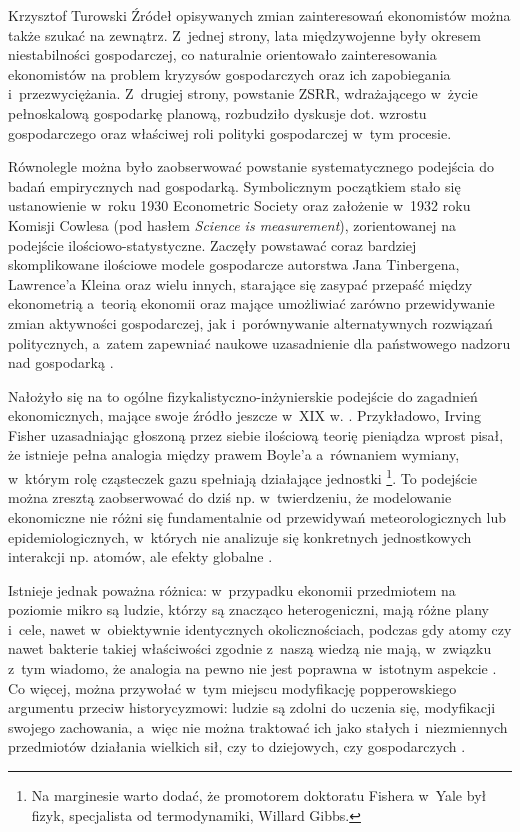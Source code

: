 \begin{artplenv}{Krzysztof Turowski}
Źródeł opisywanych zmian zainteresowań ekonomistów można także szukać na zewnątrz. Z~jednej strony, lata międzywojenne
były okresem niestabilności gospodarczej, co naturalnie orientowało zainteresowania ekonomistów na problem kryzysów
gospodarczych oraz ich zapobiegania i~przezwyciężania. Z~drugiej strony, powstanie ZSRR, wdrażającego w~życie
pełnoskalową gospodarkę planową, rozbudziło dyskusje dot. wzrostu gospodarczego oraz właściwej roli polityki
gospodarczej w~tym procesie.

Równolegle można było zaobserwować powstanie systematycznego podejścia do badań empirycznych nad gospodarką.
Symbolicznym początkiem stało się ustanowienie w~roku 1930 Econometric Society oraz założenie w~1932 roku Komisji
Cowlesa (pod hasłem \textit{Science is measurement}), zorientowanej na podejście ilościowo-statystyczne. Zaczęły
powstawać coraz bardziej skomplikowane ilościowe modele gospodarcze autorstwa Jana Tinbergena, Lawrence’a Kleina oraz
wielu innych, starające się zasypać przepaść między ekonometrią a~teorią ekonomii oraz mające umożliwiać zarówno
przewidywanie zmian aktywności gospodarczej, jak i~porównywanie alternatywnych rozwiązań politycznych, a~zatem
zapewniać naukowe uzasadnienie dla państwowego nadzoru nad gospodarką
\parencite{de_vroey_keynesian_2012}.

Nałożyło się na to ogólne fizykalistyczno-inżynierskie podejście do zagadnień ekonomicznych, mające swoje źródło jeszcze
w~XIX w.
\parencite{mirowski_more_1999}.
Przykładowo, Irving Fisher uzasadniając głoszoną przez siebie
ilościową teorię pieniądza wprost pisał, że istnieje pełna analogia między prawem Boyle’a a~równaniem wymiany, w~którym
rolę cząsteczek gazu spełniają działające jednostki
\parencite{fisher_purchasing_1922}\footnote{Na marginesie warto dodać, że promotorem
doktoratu Fishera w~Yale był fizyk, specjalista od termodynamiki, Willard Gibbs.}. To podejście można zresztą
zaobserwować do dziś np. w~twierdzeniu, że modelowanie ekonomiczne nie różni się fundamentalnie od przewidywań
meteorologicznych lub epidemiologicznych, w~których nie analizuje się konkretnych jednostkowych interakcji
np. atomów, ale efekty globalne
\parencite{buchanan_forecast:_2013}.

Istnieje jednak poważna różnica: w~przypadku ekonomii przedmiotem na poziomie mikro są ludzie, którzy są znacząco
heterogeniczni, mają różne plany i~cele, nawet w~obiektywnie identycznych okolicznościach, podczas gdy atomy czy nawet
bakterie takiej właściwości zgodnie z~naszą wiedzą nie mają, w~związku z~tym wiadomo, że analogia na pewno nie jest
poprawna w~istotnym aspekcie
\parencite{penrose_biological_1952}.
Co więcej, można przywołać w~tym miejscu
modyfikację popperowskiego argumentu przeciw historycyzmowi: ludzie są zdolni do uczenia się, modyfikacji swojego
zachowania, a~więc nie można traktować ich jako stałych i~niezmiennych przedmiotów działania wielkich sił, czy to
dziejowych, czy gospodarczych
\parencite{popper_poverty_1957,hoppe_economic_1995}.


\end{artplenv}
